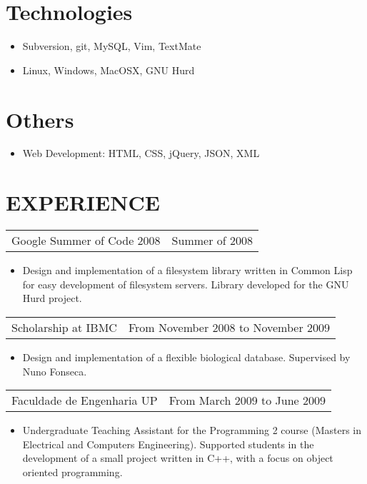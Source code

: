 \documentclass[margin]{res}
\begin{document}
\begin{resume}
\normalsize{\section{Technologies}} 
                 \begin{itemize}
                  \item Subversion, git, MySQL, Vim, TextMate
                  \item Linux, Windows, MacOSX, GNU Hurd
                  \end{itemize}
                  
\normalsize{\section{Others}}
              \begin{itemize}
                \item Web Development: HTML, CSS, jQuery, JSON, XML
              \end{itemize}

\section{EXPERIENCE}
            
                  \begin{tabular}{p{3in} r}
                  Google Summer of Code 2008 & Summer of 2008
                  \end{tabular}	
                   \begin{itemize} %
                    \item[]  Design and implementation of a filesystem library written in Common Lisp for easy development of filesystem servers. Library developed for the GNU Hurd project. 
		   \end{itemize} 
		   
		 \begin{tabular}{p{3in} r}
                  Scholarship at IBMC &  From November 2008 to November 2009 
                 \end{tabular}
		  \begin{itemize}
                   \item[] Design and implementation of a flexible biological database. Supervised by Nuno Fonseca.
                  \end{itemize}
                  
                 \begin{tabular}{p{3in} r} %
                  Faculdade de Engenharia UP &  From March 2009 to June 2009
                 \end{tabular}
                  \begin{itemize}					        
                   \item[] Undergraduate Teaching Assistant for the Programming 2 course (Masters in Electrical and Computers Engineering). Supported students in the development of a small project written in C++, with a focus on object oriented programming.
                  \end{itemize}
                  

\end{resume}
\end{document}
